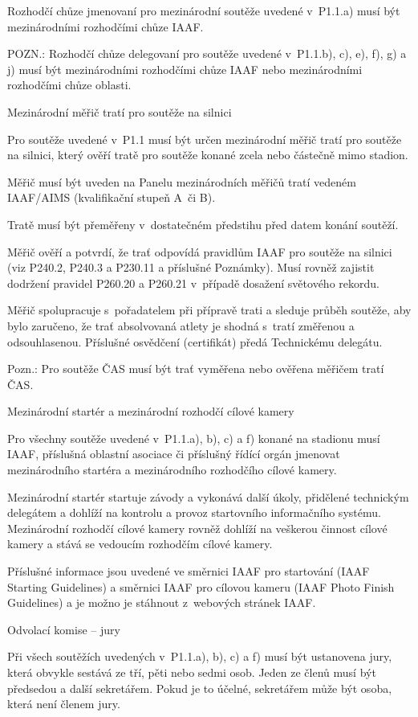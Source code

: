 Rozhodčí chůze jmenovaní pro mezinárodní soutěže uvedené v~P1.1.a) musí být mezinárodními rozhodčími chůze IAAF.

POZN.: Rozhodčí chůze delegovaní pro soutěže uvedené v~P1.1.b), c), e), f), g) a j) musí být mezinárodními rozhodčími chůze IAAF nebo mezinárodními rozhodčími chůze oblasti.

\secc Mezinárodní měřič tratí pro soutěže na silnici

Pro soutěže uvedené v~P1.1 musí být určen mezinárodní měřič tratí pro soutěže na silnici, který ověří tratě pro soutěže konané zcela nebo částečně mimo stadion.

Měřič musí být uveden na Panelu mezinárodních měřičů tratí vedeném IAAF/AIMS (kvalifikační stupeň A~či B).

Tratě musí být přeměřeny v~dostatečném předstihu před datem konání soutěží.

Měřič ověří a potvrdí, že trať odpovídá pravidlům IAAF pro soutěže na silnici (viz P240.2, P240.3 a P230.11 a příslušné Poznámky).
Musí rovněž zajistit dodržení pravidel P260.20 a P260.21 v~případě dosažení světového rekordu.

Měřič spolupracuje s~pořadatelem při přípravě trati a sleduje průběh soutěže, aby bylo zaručeno, že trať absolvovaná atlety je shodná s~tratí změřenou a odsouhlasenou.
Příslušné osvědčení (certifikát) předá Technickému delegátu.

Pozn.: Pro soutěže ČAS musí být trať vyměřena nebo ověřena měřičem tratí ČAS.

\secc Mezinárodní startér a mezinárodní rozhodčí cílové kamery

Pro všechny soutěže uvedené v~P1.1.a), b), c) a f) konané na stadionu musí IAAF, příslušná oblastní asociace či příslušný řídící orgán jmenovat mezinárodního startéra a mezinárodního rozhodčího cílové kamery.

Mezinárodní startér startuje závody a vykonává další úkoly, přidělené technickým delegátem a dohlíží na kontrolu a provoz startovního informačního systému.
Mezinárodní rozhodčí cílové kamery rovněž dohlíží na veškerou činnost cílové kamery a stává se vedoucím rozhodčím cílové kamery.

Příslušné informace jsou uvedené ve směrnici IAAF pro startování (IAAF Starting Guidelines) a směrnici IAAF pro cílovou kameru (IAAF Photo Finish Guidelines) a je možno je stáhnout z~webových stránek IAAF.

\secc Odvolací komise -- jury

Při všech soutěžích uvedených v~P1.1.a), b), c) a f) musí být ustanovena jury, která obvykle sestává ze tří, pěti nebo sedmi osob.
Jeden ze členů musí být předsedou a další sekretářem.
Pokud je to účelné, sekretářem může být osoba, která není členem jury.

